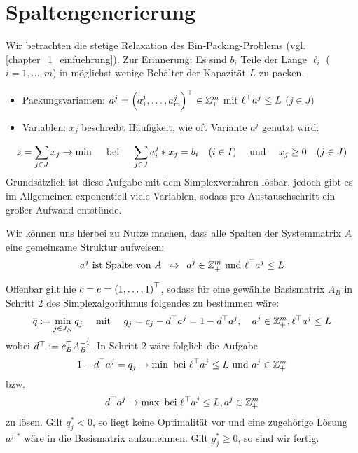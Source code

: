 \section{Spaltengenerierung}

Wir betrachten die stetige Relaxation des Bin-Packing-Problems (vgl. \cref{chapter_1_einfuehrung}). Zur Erinnerung: Es sind $b_i$ Teile der Länge $\ell_i$ ($i = 1, \dots, m$) in möglichst wenige Behälter der Kapazität $L$ zu packen. 
\begin{itemize}[nolistsep, topsep=-\parskip]
	\item Packungsvarianten: $a^j = \left( a_1^j , \dots , a_m^j \right)^{\top} \in \mathbb{Z}_+^m$ mit $\ell^{\top}a^j \le L$ ($j \in J$)
	\item Variablen: $x_j$ beschreibt Häufigkeit, wie oft Variante $a^j$ genutzt wird.
\end{itemize}
\begin{equation*}
	z = \sum_{j \in  J} x_j \to \min \quad \text{ bei } \quad \sum_{j \in J} a_i^j * x_j = b_i \quad (i \in I) \quad \text{ und } \quad x_j \ge 0 \quad (j \in J)
\end{equation*}
Grundsätzlich ist diese Aufgabe mit dem Simplexverfahren lösbar, jedoch gibt es im Allgemeinen exponentiell viele Variablen, sodass pro Austauschschritt ein großer Aufwand entstünde.

Wir können uns hierbei zu Nutze machen, dass alle Spalten der Systemmatrix $A$ eine gemeinsame Struktur aufweisen:
\begin{equation*}
	a^j \text{ ist Spalte von } A \enskip \Leftrightarrow \enskip a^j \in \mathbb{Z}_+^m \text{ und } \ell^{\top} a^j \le L
\end{equation*}

Offenbar gilt hie $c = e = \left( 1, \dots, 1 \right)^{\top}$, sodass für eine gewählte Basismatrix $A_B$ in Schritt 2 des Simplexalgorithmus folgendes zu bestimmen wäre:
\begin{equation*}
	\overline{q} \mathrel{:=} \min_{j \in J_N} q_j \quad \text{ mit } \quad q_j = c_j - d^{\top} a^j = 1 - d^{\top}a^j, \quad a^j \in \mathbb{Z}_+^m, \ell^{\top} a^j \le L
\end{equation*}
wobei $d^{\top} \mathrel{:=} c_B^{\top} A_B^{-1}$. In Schritt 2 wäre folglich die Aufgabe 
\begin{equation*}
	1 - d^{\top} a^j = q_j \to \min \text{ bei } \ell^{\top} a^j \le L \text{ und } a^j \in \mathbb{Z}_+^m
\end{equation*}
bzw. 
\begin{equation*}
	d^{\top} a^j \to \max \text{ bei } \ell^{\top} a^j \le L, a^j \in \mathbb{Z}_+^m
\end{equation*}
zu lösen.
Gilt $q_j^\ast < 0$, so liegt keine Optimalität vor und eine zugehörige Lösung $a^{j, \ast}$ wäre in die Basismatrix aufzunehmen. Gilt $g_j^\ast \ge 0$, so sind wir fertig.